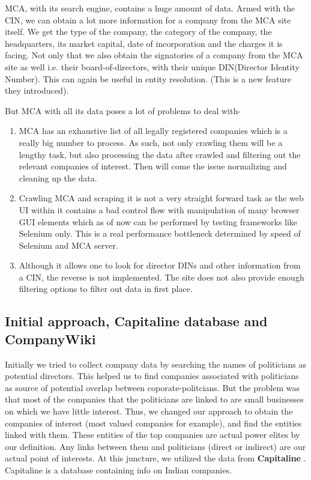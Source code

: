 MCA, with its search engine, contains a huge amount of data. Armed with the CIN, we can obtain a lot more information for a company from the MCA site itself. We get the type of the company, the category of the company, the headquarters, its market capital, date of incorporation and the charges it is facing. Not only that we also obtain the signatories of a company from the MCA site as well i.e. their board-of-directors, with their unique DIN(Director Identity Number). This can again be useful in entity resolution. (This is a new feature they introduced).

But MCA with all its data poses a lot of problems to deal with-
\begin{enumerate}
    \item MCA has an exhaustive list of all legally registered companies which is a really big number to process. As such, not only crawling  them will be a lengthy task, but also processing the data after crawled and filtering out the relevant companies of interest. Then will come the issue normalizing and cleaning up the data.
    \item Crawling MCA and scraping it is not a very straight forward task as the web UI within it contains a bad control flow with  manipulation of many browser GUI elements which as of now can be performed by testing frameworks like Selenium only. This is a real performance bottleneck determined by speed of Selenium and MCA server. 
    \item Although it allows one to look for director DINs and other information from a CIN, the reverse is not implemented. The site does not also provide enough filtering options to filter out data in first place.
\end{enumerate}

\subsection{Initial approach, Capitaline database and CompanyWiki}

Initially we tried to collect company data by searching the names of politicians as potential directors. This helped us to find companies associated with politicians as source of potential overlap between coporate-politcians. But the problem was that most of the companies that the politicians are linked to are small businesses on which we have little interest. Thus, we changed our approach to obtain the companies of interest (most valued companies for example), and find the entities linked with them. These entities of the top companies are actual power elites by our definition. Any links between them and politicians (direct or indirect) are our actual point of interests.
At this juncture, we utilized the data from \textbf{Capitaline} \cite{capitaline}. Capitaline is a database containing info on Indian companies. 

